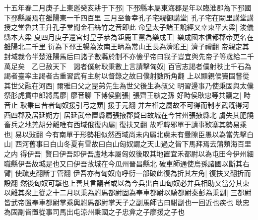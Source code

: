 十五年春二月庚子上東廵癸亥耕于下邳|{
	下邳縣本屬東海郡是年以臨淮郡為下邳國下邳縣屬焉在雒陽東一千四百里}
三月至魯幸孔子宅親御講堂|{
	孔子宅在闕里講堂講授之堂魯共王升孔子堂聞金石絲竹之音即此}
命皇太子諸王說經又幸東平大梁|{
	浚儀縣本大梁}
夏四月庚子還宫封皇子恭為鉅鹿王黨為樂成王|{
	樂成國本信都郡帝更名在雒陽北二千里}
衍為下邳王暢為汝南王昞為常山王長為濟隂王|{
	濟子禮翻}
帝親定其封域裁令半楚淮陽馬后曰諸子數縣於制不亦儉乎帝曰我子豈宜與先帝子等歲給二千萬足矣　乙巳赦天下　謁者僕射耿秉數上言請擊匈奴|{
	百官志謁者僕射秩比千石為謁者臺率主謁者古重習武有主射以督錄之故曰僕射數所角翻}
上以顯親侯竇固嘗從其世父融在河西|{
	爾雅曰父之昆弟先生為世父後生為叔父}
明習邊事乃使秉固與太僕祭肜虎賁中郎將馬廖|{
	廖音聊}
下博侯劉張|{
	張齊王縯之孫}
好畤侯耿忠等共議之|{
	畤音止}
耿秉曰昔者匈奴援引弓之類|{
	援于元翻}
并左袵之屬故不可得而制孝武旣得河西四郡及居延朔方|{
	居延武帝置縣屬張掖郡賢曰故城在今甘州張掖縣北}
虜失其肥饒畜兵之地羌胡分離唯有西域俄復内屬|{
	復扶又翻}
故呼韓邪單于請事欵塞其勢易乘也|{
	易以䜴翻}
今有南單于形勢相似然西域尚未内屬北虜未有釁隙臣愚以為當先撃白山|{
	西河舊事曰白山冬夏有雪故曰白山匈奴謂之天山過之皆下馬拜焉去蒲類海百里之内}
得伊吾|{
	賢曰伊吾即伊吾盧地本屬匈奴後取其地置宜禾都尉以為屯田今伊州細職縣伊吾故城是也又曰伊吾故城在今瓜州晉昌縣北}
破車師通使烏孫諸國以斷其右臂|{
	使疏吏翻斷丁管翻}
伊吾亦有匈奴南呼衍一部破此復為折其左角|{
	復扶又翻折而設翻}
然後匈奴可撃也上善其言議者或以為今兵出白山匈奴必并兵相助又當分其東以離其衆上從之十二月以秉為駙馬都尉固為奉車都尉以騎都尉秦彭為秉副|{
	三都尉皆武帝置奉車都尉掌乘輿駙馬都尉掌天子之副馬師古曰駙副也一回近也疾也}
耿忠為固副皆置從事司馬出屯涼州秉國之子忠弇之子廖援之子也

